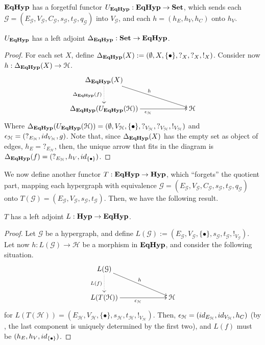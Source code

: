 $\textbf{\textup{EqHyp}}$ has a forgetful functor $U_{\textbf{\textup{EqHyp}}}:\textbf{\textup{EqHyp}} \to \mathbf{Set}$, which sends each $\mathcal{G} = (E_\mathcal{G}, V_{\mathcal{G}}, C_\mathcal{G}, s_\mathcal{G}, t_\mathcal{G}, q_\mathcal{G})$ into $V_\mathcal{G}$, and each $h = (h_E, h_V, h_C)$ onto $h_V$. 

\begin{proposition}
	$U_{\textbf{\textup{EqHyp}}}$ has a left adjoint $\Delta_{\textbf{\textup{EqHyp}}}: \mathbf{Set} \to \textbf{\textup{EqHyp}}$.
\end{proposition}

\begin{proof}
	For each set $X$, define $\Delta_{\textbf{\textup{EqHyp}}}(X):= (\emptyset, X, \{\bullet\}, ?_X, ?_X, !_X)$. Consider now $h: \Delta_{\textbf{\textup{EqHyp}}}(X) \to \mathcal{H}$.
	\[\xymatrix@C=2.3cm{
			\Delta_{\EqHyp}(X) \ar@{.>}[d]_{\Delta_\EqHyp(f)} \ar[dr]^{h} & \\
			\Delta_\EqHyp(U_{\EqHyp}(\mathcal{H})) \ar[r]_{\epsilon_{\mathcal{H}}} & \mathcal{H}
	}\]
	Where $\Delta_{\textbf{\textup{EqHyp}}}(U_{\textbf{\textup{EqHyp}}}(\mathcal{H})) = (\emptyset, V_\mathcal{H}, \{\bullet\}, ?_{V_\mathcal{H}}, ?_{V_\mathcal{H}}, !_{V_\mathcal{H}})$ and $\epsilon_{\mathcal{H}} = (?_{E_\mathcal{H}}, \id{V_\mathcal{H}}, g)$.
	Note that, since $\Delta_{\textbf{\textup{EqHyp}}}(X)$ has the empty set as object of edges, $h_E = ?_{E_\mathcal{H}}$, then, the unique arrow that fits in the diagram is $\Delta_{\EqHyp}(f) = (?_{E_\mathcal{H}}, h_V, \id{\{\bullet\}})$.
\end{proof}

We now define another functor $T: \textbf{\textup{EqHyp}} \to \textbf{\textup{Hyp}}$, which ``forgets'' the quotient part, mapping each hypergraph with equivalence $\mathcal{G} = (E_\mathcal{G}, V_{\mathcal{G}}, C_\mathcal{G}, s_\mathcal{G}, t_\mathcal{G}, q_\mathcal{G})$ onto $T(\mathcal{G})=(E_{\mathcal{G}}, V_{\mathcal{G}}, s_\mathcal{G}, t_{\mathcal{G}})$. Then, we have the following result.

\begin{proposition}
	$T$ has a left adjoint $L: \textbf{\textup{Hyp}} \to \textbf{\textup{EqHyp}}$.
\end{proposition}

\begin{proof}
	Let $\mathcal{G}$ be a hypergraph, and define $L(\mathcal{G}) := (E_\mathcal{G}, V_{\mathcal{G}}, \{\bullet\}, s_\mathcal{G}, t_\mathcal{G}, !_{V_\mathcal{G}})$. Let now $h: L(\mathcal{G})\to \mathcal{H}$ be a morphism in $\textbf{\textup{EqHyp}}$, and consider the following situation.
	\[\xymatrix@C=2.3cm{
		L(\mathcal{G}) \ar@{.>}[d]_{L(f)} \ar[dr]^{h}\\ L(T(\mathcal{H})) \ar[r]_{\epsilon_{\mathcal{H}}} & \mathcal{H}
	}\]
	for $L(T(\mathcal{H}))=(E_\mathcal{H}, V_{\mathcal{H}}, \{\bullet\}, s_\mathcal{H}, t_\mathcal{H}, !_{V_\mathcal{H}})$. Then, $\epsilon_\mathcal{H} = (\id{E_\mathcal{H}}, \id{V_\mathcal{H}}, h_C)$ (by , the last component is uniquely determined by the first two), and $L(f)$ must be $(h_E, h_V, \id{\{\bullet\}})$.
\end{proof}

